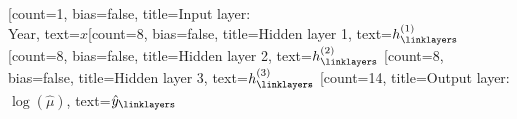 \documentclass{standalone}
\begin{document}
    \begin{neuralnetwork}[height=14]
        \newcommand{\x}[2]{$x$}
	\newcommand{\Year}[2]{\small$\text{Year}_i$}
	\newcommand{\y}[2]{$\hat{y}_{#2}$}
        \newcommand{\mort}[2]{$\hat{\mu}_#2$}
        \newcommand{\hfirst}[2]{\small $h^{(1)}_#2$}
        \newcommand{\hsecond}[2]{\small $h^{(2)}_#2$}
        \newcommand{\hthird}[2]{\small $h^{(3)}_#2$}
	[count=1, bias=false, title=Input layer:\\Year, text=\x]
	\hiddenlayer[count=8, bias=false, title=\small{Hidden layer 1}, text=\hfirst] \linklayers
	\hiddenlayer[count=8, bias=false, title=\small{Hidden layer 2}, text=\hsecond] \linklayers
	\hiddenlayer[count=8, bias=false, title=\small{Hidden layer 3}, text=\hthird] \linklayers
	\outputlayer[count=14, title=Output layer:\\$\log(\hat{\mu})$, text=\y] \linklayers
    \end{neuralnetwork}
\end{document}
